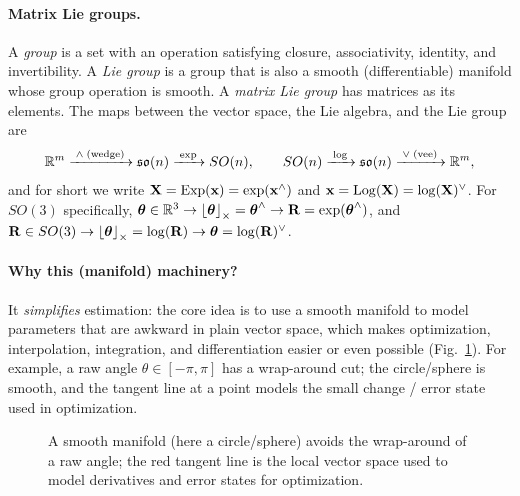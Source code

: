 \paragraph{Matrix Lie groups.}
A \emph{group} is a set with an operation satisfying closure, associativity, identity, and invertibility. A \emph{Lie group} is a group that is also a smooth (differentiable) manifold whose group operation is smooth. A \emph{matrix Lie group} has matrices as its elements. The maps between the vector space, the Lie algebra, and the Lie group are
\begin{align}
\mathbb{R}^{m} \xrightarrow{\;\wedge\;(\text{wedge})\;} \mathfrak{so}(n) \xrightarrow{\;\exp\;} SO(n), \qquad
SO(n) \xrightarrow{\;\log\;} \mathfrak{so}(n) \xrightarrow{\;\vee\;(\text{vee})\;} \mathbb{R}^{m},
\end{align}
and for short we write $\boldsymbol{\mathbf{X}} = \operatorname{Exp}(\boldsymbol{\mathbf{x}}) = \exp(\boldsymbol{\mathbf{x}}^{\wedge})$ and $\boldsymbol{\mathbf{x}} = \operatorname{Log}(\boldsymbol{\mathbf{X}}) = \log(\boldsymbol{\mathbf{X}})^{\vee}$. For $SO(3)$ specifically, $\boldsymbol{\mathbf{\theta}}\in\mathbb{R}^3 \to \left\lfloor\boldsymbol{\mathbf{\theta}}\right\rfloor_{\times} = \boldsymbol{\mathbf{\theta}}^{\wedge} \to \boldsymbol{\mathbf{R}} = \exp(\boldsymbol{\mathbf{\theta}}^{\wedge})$, and $\boldsymbol{\mathbf{R}}\in SO(3) \to \left\lfloor\boldsymbol{\mathbf{\theta}}\right\rfloor_{\times} = \log(\boldsymbol{\mathbf{R}}) \to \boldsymbol{\mathbf{\theta}} = \log(\boldsymbol{\mathbf{R}})^{\vee}$.

\paragraph{Why this (manifold) machinery?}
It \emph{simplifies} estimation: the core idea is to use a smooth manifold to model parameters that are awkward in plain vector space, which makes optimization, interpolation, integration, and differentiation easier or even possible (Fig.~\ref{fig:lec02-manifold}). For example, a raw angle $\theta\in[-\pi,\pi]$ has a wrap-around cut; the circle/sphere is smooth, and the tangent line at a point models the small change / error state used in optimization.

\begin{figure}[H]
\centering
{}
\caption{A smooth manifold (here a circle/sphere) avoids the wrap-around of a raw angle; the red tangent line is the local vector space used to model derivatives and error states for optimization.}
\label{fig:lec02-manifold}
\end{figure}


